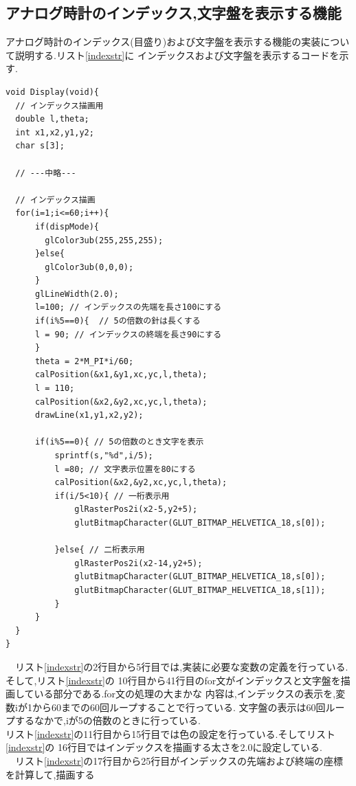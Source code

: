\documentclass[a4j]{jarticle}
\begin{document}
    \subsection{アナログ時計のインデックス,文字盤を表示する機能}
    アナログ時計のインデックス(目盛り)および文字盤を表示する機能の実装について説明する.リスト\ref{indexstr}に
    インデックスおよび文字盤を表示するコードを示す.\\
    \begin{lstlisting}[basicstyle=\ttfamily\footnotesize, frame=single,label=indexstr,caption=インデックスと文字盤の実装]
void Display(void){
  // インデックス描画用
  double l,theta; 
  int x1,x2,y1,y2;
  char s[3];

  // ---中略---

  // インデックス描画
  for(i=1;i<=60;i++){
      if(dispMode){
        glColor3ub(255,255,255);
      }else{
        glColor3ub(0,0,0);
      }
      glLineWidth(2.0);
      l=100; // インデックスの先端を長さ100にする
      if(i%5==0){  // 5の倍数の針は長くする
      l = 90; // インデックスの終端を長さ90にする
      }
      theta = 2*M_PI*i/60;
      calPosition(&x1,&y1,xc,yc,l,theta);
      l = 110;
      calPosition(&x2,&y2,xc,yc,l,theta);
      drawLine(x1,y1,x2,y2);

      if(i%5==0){ // 5の倍数のとき文字を表示
          sprintf(s,"%d",i/5);
          l =80; // 文字表示位置を80にする
          calPosition(&x2,&y2,xc,yc,l,theta);
          if(i/5<10){ // 一桁表示用
              glRasterPos2i(x2-5,y2+5);
              glutBitmapCharacter(GLUT_BITMAP_HELVETICA_18,s[0]);

          }else{ // 二桁表示用
              glRasterPos2i(x2-14,y2+5);
              glutBitmapCharacter(GLUT_BITMAP_HELVETICA_18,s[0]);
              glutBitmapCharacter(GLUT_BITMAP_HELVETICA_18,s[1]);
          }
      }
  }
}
    \end{lstlisting}
    　リスト\ref{indexstr}の2行目から5行目では,実装に必要な変数の定義を行っている.そして,リスト\ref{indexstr}の
    10行目から41行目のfor文がインデックスと文字盤を描画している部分である.for文の処理の大まかな
    内容は,インデックスの表示を,変数iが1から60までの60回ループすることで行っている.
    文字盤の表示は60回ループするなかで,iが5の倍数のときに行っている.\\
    リスト\ref{indexstr}の11行目から15行目では色の設定を行っている.そしてリスト\ref{indexstr}の
    16行目ではインデックスを描画する太さを2.0に設定している.\\
    　リスト\ref{indexstr}の17行目から25行目がインデックスの先端および終端の座標を計算して,描画する
\end{document}
